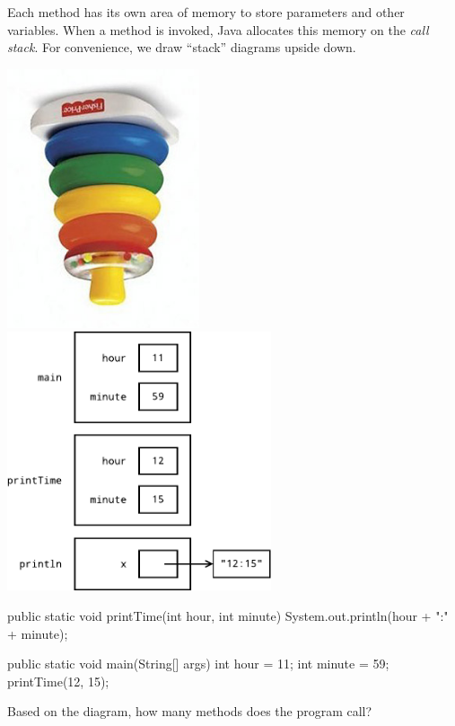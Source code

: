 
Each method has its own area of memory to store parameters and other variables.
When a method is invoked, Java allocates this memory on the \emph{call stack}.
For convenience, we draw ``stack'' diagrams upside down.

\begin{center}
\includegraphics[height=3in]{CS1/stack-rings1.png}
\hspace{1em}
\includegraphics[height=3in]{CS1/stack1.pdf}
\end{center}

\begin{javalst}
    public static void printTime(int hour, int minute) {
        System.out.println(hour + ":" + minute);
    }
    
    public static void main(String[] args) {
        int hour = 11;
        int minute = 59;
        printTime(12, 15);
    }
\end{javalst}




\Q Based on the diagram, how many methods does the program call? 
\vspace{1em}


